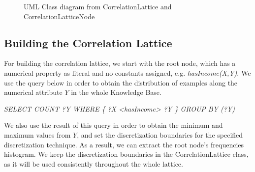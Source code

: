 \begin{figure}
\caption{UML Class diagram from CorrelationLattice and CorrelationLatticeNode}
\begin{center}
\label{fig:classDiagram}
\end{center}
\end{figure}


\subsection{Building the Correlation Lattice}

For building the correlation lattice, we start with the root node, which has a numerical property as literal and no
constants assigned, e.g. \emph{hasIncome(X,Y)}. We use the query below in order to obtain the  distribution of 
examples along the numerical attribute $Y$ in the whole Knowledge Base.

\begin{center}
 \emph{SELECT COUNT ?Y WHERE \{ ?X <hasIncome> ?Y \} GROUP BY (?Y)}
\end{center}

We also use the result of this query in order to obtain the minimum and maximum values from $Y$, and set the
discretization boundaries for the specified discretization technique. As a result, we can extract the root
node's frequencies histogram. We keep the discretization boundaries in the CorrelationLattice class, as it will be used
consistently throughout the whole lattice.

